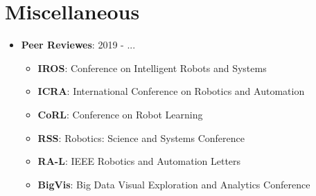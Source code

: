 \documentclass[letterpaper,11pt]{article}
\newcommand{\resumeItem}[2]{
\item\small{
		\textbf{#1}{: #2 \vspace{-2pt}}
	}
}
\newcommand{\resumeSubItem}[2]{\resumeItem{#1}{#2}\vspace{-4pt}}
\newcommand{\resumeSubHeadingListStart}{\begin{itemize}[leftmargin=*,label=]}
\newcommand{\resumeSubHeadingListEnd}{\end{itemize}}
\newcommand{\resumeItemListStart}{\begin{itemize}[label=$\bullet$]}
\newcommand{\resumeItemListEnd}{\end{itemize}\vspace{-5pt}}
\begin{document}
\section{Miscellaneous}
\resumeSubHeadingListStart
\resumeSubItem{Peer Reviewes}{2019 - ...}
\resumeItemListStart
\resumeItem{IROS}{Conference on Intelligent Robots and Systems}
\resumeItem{ICRA}{International Conference on Robotics and Automation}
\resumeItem{CoRL}{Conference on Robot Learning}
\resumeItem{RSS}{Robotics: Science and Systems Conference}
\resumeItem{RA-L}{IEEE Robotics and Automation Letters}
\resumeItem{BigVis}{Big Data Visual Exploration and Analytics Conference}

\resumeItemListEnd
\resumeSubHeadingListEnd

\end{document}
